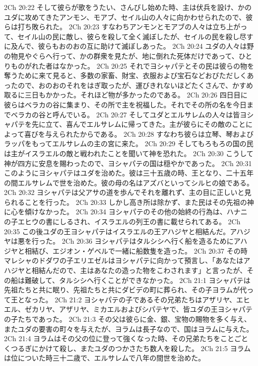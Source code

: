 2Ch 20:22  そして彼らが歌をうたい、さんびし始めた時、主は伏兵を設け、かのユダに攻めてきたアンモン、モアブ、セイル山の人々に向かわせられたので、彼らは打ち敗られた。
2Ch 20:23  すなわちアンモンとモアブの人々は立ち上がって、セイル山の民に敵し、彼らを殺して全く滅ぼしたが、セイルの民を殺し尽すに及んで、彼らもおのおの互に助けて滅ぼしあった。
2Ch 20:24  ユダの人々は野の物見やぐらへ行って、かの群衆を見たが、地に倒れた死体だけであって、ひとりものがれた者はなかった。
2Ch 20:25  それでヨシャパテとその民は彼らの物を奪うために来て見ると、多数の家畜、財宝、衣服および宝石などおびただしくあったので、おのおのそれをはぎ取ったが、運びきれないほどたくさんで、かすめ取るに三日もかかった。それほど物が多かったのである。
2Ch 20:26  四日目に彼らはベラカの谷に集まり、その所で主を祝福した。それでその所の名を今日までベラカの谷と呼んでいる。
2Ch 20:27  そしてユダとエルサレムの人々は皆ヨシャパテを先に立て、喜んでエルサレムに帰ってきた。主が彼らにその敵のことによって喜びを与えられたからである。
2Ch 20:28  すなわち彼らは立琴、琴およびラッパをもってエルサレムの主の宮に来た。
2Ch 20:29  そしてもろもろの国の民は主がイスラエルの敵と戦われたことを聞いて神を恐れた。
2Ch 20:30  こうして神が四方に安息を賜わったので、ヨシャパテの国は穏やかであった。
2Ch 20:31  このようにヨシャパテはユダを治めた。彼は三十五歳の時、王となり、二十五年の間エルサレムで世を治めた。彼の母の名はアズバといってシルヒの娘である。
2Ch 20:32  ヨシャパテは父アサの道を歩んでそれを離れず、主の目に正しいと見られることを行った。
2Ch 20:33  しかし高き所は除かず、また民はその先祖の神に心を傾けなかった。
2Ch 20:34  ヨシャパテのその他の始終の行為は、ハナニの子エヒウの書にしるされ、イスラエルの列王の書に載せられてある。
2Ch 20:35  この後ユダの王ヨシャパテはイスラエルの王アハジヤと相結んだ。アハジヤは悪を行った。
2Ch 20:36  ヨシャパテはタルシシへ行く船を造るためにアハジヤと相結び、エジオン・ゲベルで一緒に船数隻を造った。
2Ch 20:37  その時マレシャのドダワの子エリエゼルはヨシャパテに向かって預言し、「あなたはアハジヤと相結んだので、主はあなたの造った物をこわされます」と言ったが、その船は難破して、タルシシへ行くことができなかった。
2Ch 21:1  ヨシャパテは先祖たちと共に眠り、先祖たちと共にダビデの町に葬られ、その子ヨラムが代って王となった。
2Ch 21:2  ヨシャパテの子であるその兄弟たちはアザリヤ、エヒエル、ゼカリヤ、アザリヤ、ミカエルおよびシパテヤで、皆ユダの王ヨシャパテの子たちであった。
2Ch 21:3  その父は彼らに金、銀、宝物の賜物を多く与え、またユダの要害の町々を与えたが、ヨラムは長子なので、国はヨラムに与えた。
2Ch 21:4  ヨラムはその父の位に登って強くなった時、その兄弟たちをことごとくつるぎにかけて殺し、またユダのつかさたち数人を殺した。
2Ch 21:5  ヨラムは位についた時三十二歳で、エルサレムで八年の間世を治めた。
